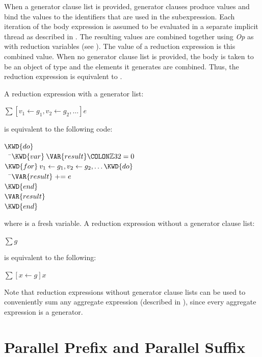 When a generator clause
list is provided, generator clauses produce values and bind the values to the
identifiers that are used in the subexpression.  Each iteration of the
body expression is assumed to be evaluated in a separate implicit
thread as described in .  The resulting values are
combined together using \emph{Op}
\label{redexpr-redvar}
as with reduction variables (see ).
The value of a reduction expression is this combined value.
When no generator clause list is provided, the body is taken to be an
object of type  and the elements it generates are
combined.  Thus, the reduction expression  is equivalent
to .

A reduction expression with a generator list:
\begin{Fortress}
\(\sum [v_{\mathrm{1}} \gets g_{\mathrm{1}}, v_{\mathrm{2}} \gets g_{\mathrm{2}}, \ldots] e\)
\end{Fortress}
is equivalent to the following code:
\begin{Fortress}
\(\KWD{do}\)\\
{\tt~~}\pushtabs\=\+\(  \KWD{var}\:\VAR{result}\COLON \mathbb{Z}32 = 0\)\\
\(  \KWD{for}\:v_{1} \leftarrow g_{1}, v_{2} \leftarrow g_{2}, \ldots \KWD{do}\)\\
{\tt~~}\pushtabs\=\+\(    \VAR{result} \mathrel{+}= e\)\-\\\poptabs
\(  \KWD{end}\)\\
\(  \VAR{result}\)\-\\\poptabs
\(\KWD{end}\)
\end{Fortress}
where  is a fresh variable.
%
A reduction expression without a generator clause list:
\begin{Fortress}
\(\sum g\)
\end{Fortress}
is equivalent to the following:
\begin{Fortress}
\(\sum [x \gets g] x\)
\end{Fortress}
Note that reduction expressions without generator clause lists can be used to
conveniently sum any aggregate expression (described in
), since every aggregate expression
is a generator.

\section{Parallel Prefix and Parallel Suffix}
